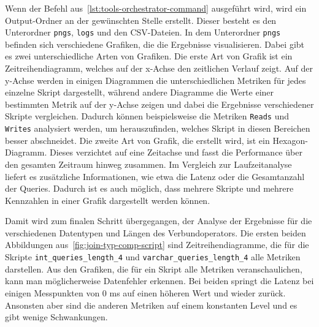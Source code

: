 Wenn der Befehl aus~\ref{lst:tools-orchestrator-command} ausgeführt wird, wird ein Output-Ordner an der gewünschten Stelle erstellt.
Dieser besteht es den Unterordner \texttt{pngs}, \texttt{logs} und den CSV-Dateien.
In dem Unterordner \texttt{pngs} befinden sich verschiedene Grafiken, die die Ergebnisse visualisieren.
Dabei gibt es zwei unterschiedliche Arten von Grafiken.
Die erste Art von Grafik ist ein Zeitreihendiagramm, welches auf der x-Achse den zeitlichen Verlauf zeigt.
Auf der y-Achse werden in einigen Diagrammen die unterschiedlichen Metriken für jedes einzelne Skript dargestellt, während andere Diagramme die Werte einer bestimmten Metrik auf der y-Achse zeigen und dabei die Ergebnisse verschiedener Skripte vergleichen.
Dadurch können beispielsweise die Metriken \texttt{Reads} und \texttt{Writes} analysiert werden, um herauszufinden, welches Skript in diesen Bereichen besser abschneidet.
Die zweite Art von Grafik, die erstellt wird, ist ein Hexagon-Diagramm.
Dieses verzichtet auf eine Zeitachse und fasst die Performance über den gesamten Zeitraum hinweg zusammen.
Im Vergleich zur Laufzeitanalyse liefert es zusätzliche Informationen, wie etwa die Latenz oder die Gesamtanzahl der Queries.
Dadurch ist es auch möglich, dass mehrere Skripte und mehrere Kennzahlen in einer Grafik dargestellt werden können.

Damit wird zum finalen Schritt übergegangen, der Analyse der Ergebnisse für die verschiedenen Datentypen und Längen des Verbundoperators.
Die ersten beiden Abbildungen aus~\ref{fig:join-typ-comp-script} sind Zeitreihendiagramme, die für die Skripte \texttt{int\_queries\_length\_4} und \texttt{varchar\_queries\_length\_4} alle Metriken darstellen.
Aus den Grafiken, die für ein Skript alle Metriken veranschaulichen, kann man möglicherweise Datenfehler erkennen.
Bei beiden springt die Latenz bei einigen Messpunkten von 0 ms auf einen höheren Wert und wieder zurück.
Ansonsten aber sind die anderen Metriken auf einem konstanten Level und es gibt wenige Schwankungen.

